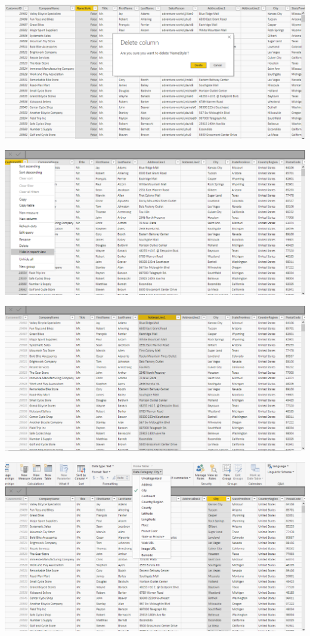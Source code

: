 	\begin{center}
	\includegraphics[width=15cm]{./Imagenes/power6}
	\end{center}	

	\begin{center}
	\includegraphics[width=15cm]{./Imagenes/power7}
	\end{center}	

	\begin{center}
	\includegraphics[width=15cm]{./Imagenes/power8}
	\end{center}	

	\begin{center}
	\includegraphics[width=15cm]{./Imagenes/power9}
	\end{center}	

